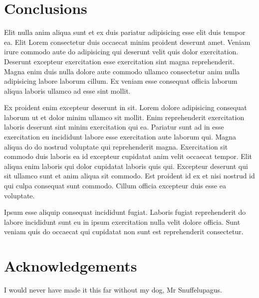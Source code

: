 \section{Conclusions}
Elit nulla anim aliqua sunt et ex duis pariatur adipisicing esse elit duis tempor ea. Elit Lorem consectetur duis occaecat minim proident deserunt amet. Veniam irure commodo aute do adipisicing qui deserunt velit quis dolor exercitation. Deserunt excepteur exercitation esse exercitation sint magna reprehenderit. Magna enim duis nulla dolore aute commodo ullamco consectetur anim nulla adipisicing labore laborum cillum. Ex veniam esse consequat officia laborum aliqua laboris ullamco ad esse sint mollit.

Ex proident enim excepteur deserunt in sit. Lorem dolore adipisicing consequat laborum ut et dolor minim ullamco sit mollit. Enim reprehenderit exercitation laboris deserunt sint minim exercitation qui ea. Pariatur sunt ad in esse exercitation eu incididunt labore esse exercitation aute laborum qui. Magna aliqua do do nostrud voluptate qui reprehenderit magna.
Exercitation sit commodo duis laboris ea id excepteur cupidatat anim velit occaecat tempor. Elit aliqua enim laboris qui dolor cupidatat laboris quis qui. Excepteur deserunt qui sit ullamco sunt et anim aliqua sit commodo. Est proident id ex et nisi nostrud id qui culpa consequat sunt commodo. Cillum officia excepteur duis esse ea voluptate.

Ipsum esse aliquip consequat incididunt fugiat. Laboris fugiat reprehenderit do labore incididunt sunt eu in ipsum exercitation nulla velit dolore officia. Sunt veniam quis do occaecat qui cupidatat non sunt est reprehenderit consectetur.

\section{Acknowledgements}
I would never have made it this far without my dog, Mr Snuffelupagus.










